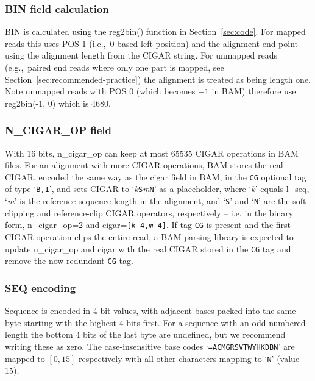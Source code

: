 \documentclass[10pt]{article}
\begin{document}
\subsubsection{BIN field calculation}\label{sec:bin-field}
{\sf BIN} is calculated using the {\sf reg2bin()} function in
Section~\ref{sec:code}.
For mapped reads this uses {\sf POS-1} (i.e.,~0-based left position) and the
alignment end point using the alignment length from the {\sf CIGAR} string.
For unmapped reads (e.g.,~paired end reads where only one part is mapped, see
Section~\ref{sec:recommended-practice}) the alignment is treated as
being length one.
Note unmapped reads with {\sf POS} $0$ (which becomes $-1$ in BAM) therefore
use {\sf reg2bin(-1, 0)} which is $4680$.

\subsubsection{N\_CIGAR\_OP field}\label{sec:ncigar}
With 16 bits, {\sf n\_cigar\_op} can keep at most 65535 CIGAR
operations in BAM files. For an alignment with more CIGAR operations, BAM
stores the real {\sf CIGAR}, encoded the same way as the {\sf cigar} field in
BAM, in the {\tt CG} optional tag of type `{\tt B,I}', and sets {\sf CIGAR} to
`\textit{k}{\tt S}\textit{m}{\tt N}' as a placeholder, where `\textit{k}' equals {\sf l\_seq}, `\textit{m}'
is the reference sequence length in the alignment, and `{\tt S}' and `{\tt N}'
are the soft-clipping and reference-clip CIGAR operators, respectively -- i.e.
in the binary form, {\sf n\_cigar\_op}=2 and {\sf cigar}={\tt [\textit{k}
4,\textit{m} 4]}. If tag {\tt CG} is present and
the first CIGAR operation clips the entire read, a BAM parsing library is
expected to update {\sf n\_cigar\_op} and {\sf cigar} with the real CIGAR
stored in the {\tt CG} tag and remove the now-redundant {\tt CG} tag.

\subsubsection{SEQ encoding}\label{sec:seq}
Sequence is encoded in 4-bit values, with adjacent bases packed into the same byte starting with the highest 4 bits first.
For a sequence with an odd numbered length the bottom 4 bits of the last byte are undefined, but we recommend writing these as zero.
The case-insensitive base codes `{\tt =ACMGRSVTWYHKDBN}' are mapped to $[0,15]$ respectively with all other characters mapping to `{\tt N}' (value 15).
\end{document}
